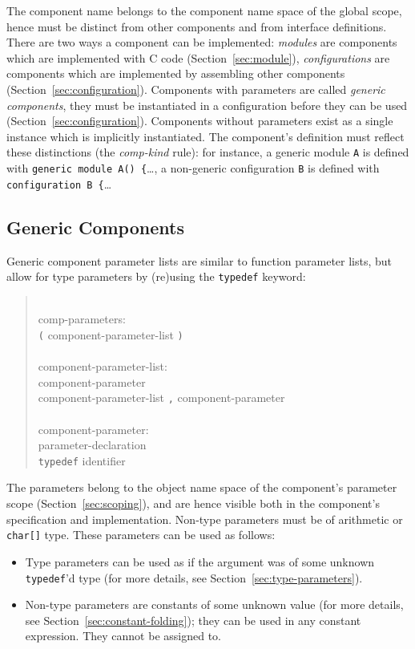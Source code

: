 \documentclass[11pt,letterpaper]{article}
\newcommand{\kw}[1]{{\tt #1}}
\newcommand{\code}[1]{{\tt #1}}
\newcommand{\grammarshift}{\vspace*{-.7cm}}
\newcommand{\grammarindent}{\hspace*{2cm}\= \\ \kill}
\begin{document}
The component name belongs to the component name space of the global scope,
hence must be distinct from other components and from interface
definitions. There are two ways a component can be implemented:
\emph{modules} are components which are implemented with C code
(Section~\ref{sec:module}), \emph{configurations} are components which are
implemented by assembling other components
(Section~\ref{sec:configuration}). Components with parameters are called
\emph{generic components}, they must be instantiated in a configuration
before they can be used (Section~\ref{sec:configuration}). Components
without parameters exist as a single instance which is implicitly
instantiated. The component's definition must reflect these distinctions
(the \emph{comp-kind} rule): for instance, a generic module \code{A} is
defined with \code{generic module A() \{}\ldots, a non-generic
configuration \code{B} is defined with \code{configuration B \{}\ldots

\subsection{Generic Components}
\label{sec:generic-components}

Generic component parameter lists are similar to function parameter lists,
but allow for type parameters by (re)using the \kw{typedef} keyword:
\begin{quote} \grammarshift \em \begin{tabbing}
\grammarindent
comp-parameters:\\
\>	\kw{(} component-parameter-list \kw{)}\\
\\
component-parameter-list:\\
\>	component-parameter\\
\>	component-parameter-list \kw{,} component-parameter\\
\\
component-parameter:\\
\>	parameter-declaration\\
\>	\kw{typedef} identifier
\end{tabbing} \end{quote}
The parameters belong to the object name space of the component's parameter
scope (Section~\ref{sec:scoping}), and are hence visible both in the
component's specification and implementation. Non-type parameters must be
of arithmetic or \code{char[]} type. These parameters can be used as
follows:
\begin{itemize}
\item Type parameters can be used as if the argument was of some unknown
\kw{typedef}'d type (for more details, see Section~\ref{sec:type-parameters}).
\item Non-type parameters are constants of some unknown value (for more
details, see Section~\ref{sec:constant-folding}); they can be used in any
constant expression. They cannot be assigned to.
\end{itemize}
\end{document}
